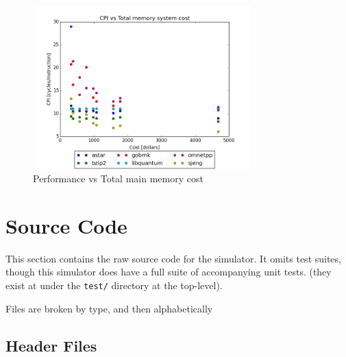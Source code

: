 \documentclass{article}
\begin{document}
\begin{figure}[ht]
    \centering
    \includegraphics[width=0.75\textwidth]{plots/CPI_vs_Total_memory_system_cost.png}
    \caption{Performance vs Total main memory cost}
    \label{fig:cpivstotalcost}
\end{figure}

\clearpage
\appendix
\section{Source Code}

This section contains the raw source code for the simulator. It omits test
suites, though this simulator does have a full suite of accompanying unit tests.
(they exist at under the \texttt{test/} directory at the top-level).

Files are broken by type, and then alphabetically

\subsection{Header Files}


\clearpage

\clearpage

\clearpage

\clearpage

\clearpage

\clearpage

\clearpage

\clearpage

\clearpage

\clearpage

\clearpage

\end{document}
